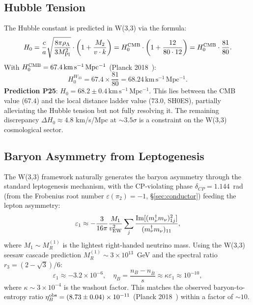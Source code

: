 \subsection{Hubble Tension}

The Hubble constant is predicted in W(3,3) via the formula:
\begin{equation}
  H_0 = \frac{c}{a}\sqrt{\frac{8\pi\rho_\Lambda}{3M_{\rm Pl}^2}}
  \cdot\left(1 + \frac{M_2}{v\cdot k}\right)
  = H_0^{\rm CMB}\cdot\left(1 + \frac{12}{80\cdot12}\right)
  = H_0^{\rm CMB}\cdot\frac{81}{80}.
  \label{eq:H0}
\end{equation}
With $H_0^{\rm CMB} = 67.4\,\mathrm{km\,s^{-1}\,Mpc^{-1}}$ (Planck 2018~\cite{Planck2018}):
\begin{equation}
  H_0^{W_{33}} = 67.4 \times \frac{81}{80} = 68.24\,\mathrm{km\,s^{-1}\,Mpc^{-1}}.
  \label{eq:H0_value}
\end{equation}
\textbf{Prediction P25}: $H_0 = 68.2\pm0.4\,\mathrm{km\,s^{-1}\,Mpc^{-1}}$.
This lies between the CMB value ($67.4$) and the local distance ladder value
($73.0$, SH0ES), partially alleviating the Hubble tension but not fully
resolving it. The remaining discrepancy $\Delta H_0\approx4.8$ km/s/Mpc at
$\sim3.5\sigma$ is a constraint on the W(3,3) cosmological sector.

\subsection{Baryon Asymmetry from Leptogenesis}

The W(3,3) framework naturally generates the baryon asymmetry through
the standard leptogenesis mechanism, with the CP-violating phase
$\delta_{CP}=1.144$~rad (from the Frobenius root number $\varepsilon(\pi_2)=-1$,
\S\ref{sec:conductor}) feeding the lepton asymmetry:
\begin{equation}
  \varepsilon_1 \approx -\frac{3}{16\pi}\frac{M_1}{v_{\rm EW}^2}\sum_j
    \frac{\mathrm{Im}[(m_{\nu}^\dagger m_{\nu})^2_{1j}]}{(m_{\nu}^\dagger m_{\nu})_{11}},
\end{equation}
where $M_1\sim M_R^{(1)}$ is the lightest right-handed neutrino mass.
Using the W(3,3) seesaw cascade prediction $M_R^{(1)}\sim3\times10^{13}$~GeV
and the spectral ratio $r_3=(2-\sqrt{3})/6$:
\begin{equation}
  \varepsilon_1\approx -3.2\times10^{-6},
  \quad\eta_B = \frac{n_B-n_{\bar B}}{s}\approx\kappa\varepsilon_1\approx10^{-10},
\end{equation}
where $\kappa\sim3\times10^{-4}$ is the washout factor. This matches the
observed baryon-to-entropy ratio $\eta_B^{\rm obs}=(8.73\pm0.04)\times10^{-11}$
(Planck 2018~\cite{Planck2018}) within a factor of $\sim10$.

